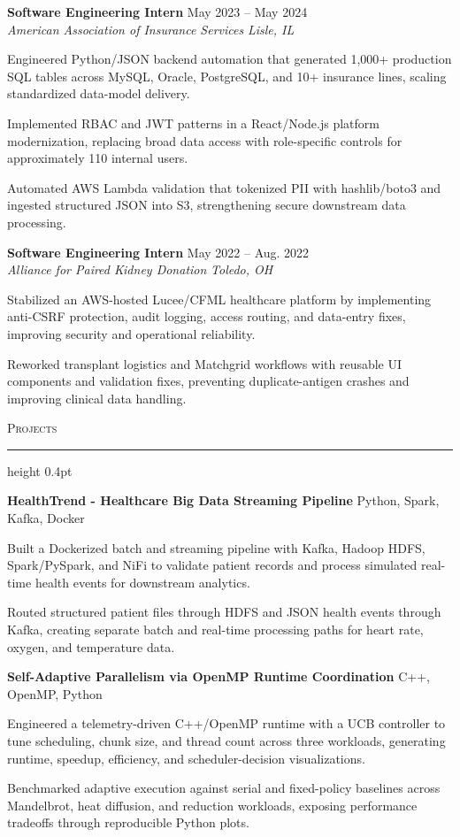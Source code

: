 \documentclass[letterpaper,11pt]{article}
\newcommand{\resumesection}[1]{%
  \par\vspace{2pt}%
  {\large\scshape #1}\par\vspace{2pt}%
  \hrule height 0.4pt\vspace{2pt}%
}
\newcommand{\resumeSubheading}[4]{
  \textbf{#1} \hfill #2\\
  \textit{#3} \hfill \textit{#4}
}
\newcommand{\projectHeading}[2]{
  \textbf{#1} \hfill #2
}
\begin{document}
\resumeSubheading
{Software Engineering Intern}{May 2023 -- May 2024}
{American Association of Insurance Services}{Lisle, IL}
\begin{tightitemize}
  \item Engineered Python/JSON backend automation that generated 1,000+ production SQL tables across MySQL, Oracle, PostgreSQL, and 10+ insurance lines, scaling standardized data-model delivery.
  \item Implemented RBAC and JWT patterns in a React/Node.js platform modernization, replacing broad data access with role-specific controls for approximately 110 internal users.
  \item Automated AWS Lambda validation that tokenized PII with hashlib/boto3 and ingested structured JSON into S3, strengthening secure downstream data processing.
\end{tightitemize}

\resumeSubheading
{Software Engineering Intern}{May 2022 -- Aug. 2022}
{Alliance for Paired Kidney Donation}{Toledo, OH}
\begin{tightitemize}
  \item Stabilized an AWS-hosted Lucee/CFML healthcare platform by implementing anti-CSRF protection, audit logging, access routing, and data-entry fixes, improving security and operational reliability.
  \item Reworked transplant logistics and Matchgrid workflows with reusable UI components and validation fixes, preventing duplicate-antigen crashes and improving clinical data handling.
\end{tightitemize}

\resumesection{Projects}
\projectHeading{HealthTrend - Healthcare Big Data Streaming Pipeline}{Python, Spark, Kafka, Docker}
\begin{tightitemize}
  \item Built a Dockerized batch and streaming pipeline with Kafka, Hadoop HDFS, Spark/PySpark, and NiFi to validate patient records and process simulated real-time health events for downstream analytics.
  \item Routed structured patient files through HDFS and JSON health events through Kafka, creating separate batch and real-time processing paths for heart rate, oxygen, and temperature data.
\end{tightitemize}

\projectHeading{Self-Adaptive Parallelism via OpenMP Runtime Coordination}{C++, OpenMP, Python}
\begin{tightitemize}
  \item Engineered a telemetry-driven C++/OpenMP runtime with a UCB controller to tune scheduling, chunk size, and thread count across three workloads, generating runtime, speedup, efficiency, and scheduler-decision visualizations.
  \item Benchmarked adaptive execution against serial and fixed-policy baselines across Mandelbrot, heat diffusion, and reduction workloads, exposing performance tradeoffs through reproducible Python plots.
\end{tightitemize}
\end{document}
